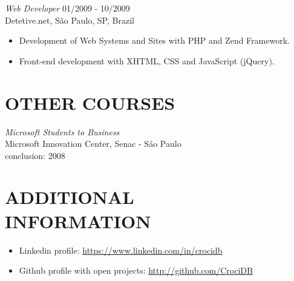 \documentclass[line,margin]{res}
\begin{document}
\begin{resume}
                {\sl Web Developer} \hfill 01/2009 - 10/2009 \\
                Detetive.net, São Paulo, SP, Brazil
                 \begin{itemize}  \itemsep -1pt
                 \item Development of Web Systems and Sites with PHP and Zend Framework.
                 \item Front-end development with XHTML, CSS and JavaScript (jQuery).
                 \end{itemize} 

\section{OTHER COURSES}             
           {\sl Microsoft Students to Business} \\
                Microsoft Innovation Center, Senac - São Paulo \\
                conclusion: 2008 


\section{ADDITIONAL \\ INFORMATION}
            \begin{itemize}  \itemsep 1pt
            \item Linkedin profile: \href{https://www.linkedin.com/in/crocidb}{https://www.linkedin.com/in/crocidb}
            \item Github profile with open projects: \href{http://github.com/CrociDB}{http://github.com/CrociDB}
            \end{itemize} 
 

\end{resume}
\end{document}
